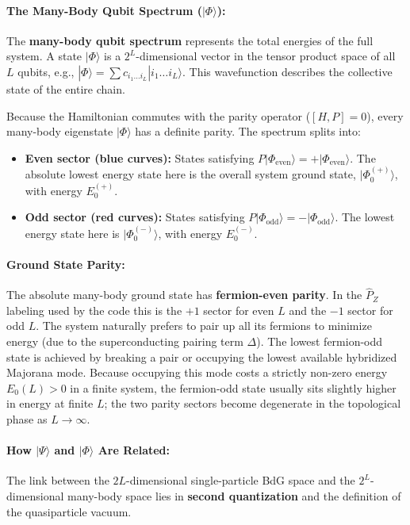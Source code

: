 \documentclass[11pt]{article}
\newcommand{\ket}[1]{|#1\rangle}
\begin{document}
\paragraph{The Many-Body Qubit Spectrum ($\ket{\Phi}$):}
The \textbf{many-body qubit spectrum} represents the total energies of the full system. A state $\ket{\Phi}$ is a $2^L$-dimensional vector in the tensor product space of all $L$ qubits, e.g., $\ket{\Phi} = \sum c_{i_1 \dots i_L} \ket{i_1 \dots i_L}$. This wavefunction describes the collective state of the entire chain. 

Because the Hamiltonian commutes with the parity operator ($[H, P] = 0$), every many-body eigenstate $\ket{\Phi}$ has a definite parity. The spectrum splits into:
\begin{itemize}
  \item \textbf{Even sector (blue curves):} States satisfying $P \ket{\Phi_{\text{even}}} = +\ket{\Phi_{\text{even}}}$. The absolute lowest energy state here is the overall system ground state, $\ket{\Phi_0^{(+)}}$, with energy $E_0^{(+)}$.
  \item \textbf{Odd sector (red curves):} States satisfying $P \ket{\Phi_{\text{odd}}} = -\ket{\Phi_{\text{odd}}}$. The lowest energy state here is $\ket{\Phi_0^{(-)}}$, with energy $E_0^{(-)}$.
\end{itemize}

\paragraph{Ground State Parity:}
The absolute many-body ground state has \textbf{fermion-even parity}. In the
$\hat{P}_Z$ labeling used by the code this is the $+1$ sector for even $L$ and
the $-1$ sector for odd $L$. The system naturally prefers to pair up all its
fermions to minimize energy (due to the superconducting pairing term $\Delta$).
The lowest fermion-odd state is achieved by breaking a pair or occupying the
lowest available hybridized Majorana mode. Because occupying this mode costs a
strictly non-zero energy $E_0(L) > 0$ in a finite system, the fermion-odd state
usually sits slightly higher in energy at finite $L$; the two parity sectors
become degenerate in the topological phase as $L \to \infty$.

\paragraph{How $\ket{\Psi}$ and $\ket{\Phi}$ Are Related:}
The link between the $2L$-dimensional single-particle BdG space and the $2^L$-dimensional many-body space lies in \textbf{second quantization} and the definition of the quasiparticle vacuum. 
\end{document}
